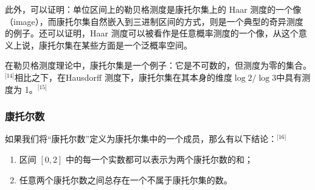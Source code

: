 此外，可以证明：单位区间上的勒贝格测度是康托尔集上的 Haar 测度的一个像（image），而康托尔集自然嵌入到三进制区间的方式，则是一个典型的奇异测度的例子。还可以证明，Haar 测度可以被看作是任意概率测度的一个像，从这个意义上说，康托尔集在某些方面是一个泛概率空间。

在勒贝格测度理论中，康托尔集是一个例子：它是不可数的，但测度为零的集合。\(^\text{[14]}\)相比之下，在Hausdorff 测度下，康托尔集在其本身的维度$\log 2 / \log 3$中具有测度为 1。\(^\text{[15]}\)
\subsubsection{康托尔数}
如果我们将“康托尔数”定义为康托尔集中的一个成员，那么有以下结论：\(^\text{[16]}\)
\begin{enumerate}
\item 区间 $[0, 2]$ 中的每一个实数都可以表示为两个康托尔数的和；
\item 任意两个康托尔数之间总存在一个不属于康托尔集的数。
\end{enumerate}